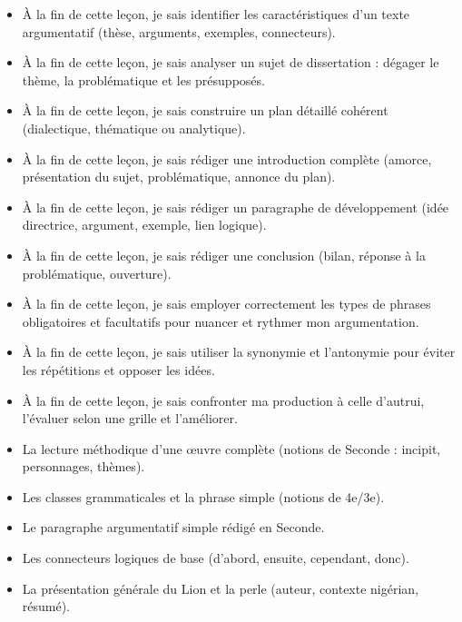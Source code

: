 \documentclass[11pt]{article}
\begin{document}
\begin{objectifs}
\begin{itemize}
\item À la fin de cette leçon, je sais identifier les caractéristiques d'un texte argumentatif (thèse, arguments, exemples, connecteurs).
\item À la fin de cette leçon, je sais analyser un sujet de dissertation : dégager le thème, la problématique et les présupposés.
\item À la fin de cette leçon, je sais construire un plan détaillé cohérent (dialectique, thématique ou analytique).
\item À la fin de cette leçon, je sais rédiger une introduction complète (amorce, présentation du sujet, problématique, annonce du plan).
\item À la fin de cette leçon, je sais rédiger un paragraphe de développement (idée directrice, argument, exemple, lien logique).
\item À la fin de cette leçon, je sais rédiger une conclusion (bilan, réponse à la problématique, ouverture).
\item À la fin de cette leçon, je sais employer correctement les types de phrases obligatoires et facultatifs pour nuancer et rythmer mon argumentation.
\item À la fin de cette leçon, je sais utiliser la synonymie et l'antonymie pour éviter les répétitions et opposer les idées.
\item À la fin de cette leçon, je sais confronter ma production à celle d'autrui, l'évaluer selon une grille et l'améliorer.
\end{itemize}
\end{objectifs}

\begin{prerequis}
\begin{itemize}
\item La lecture méthodique d'une œuvre complète (notions de Seconde : incipit, personnages, thèmes).
\item Les classes grammaticales et la phrase simple (notions de 4e/3e).
\item Le paragraphe argumentatif simple rédigé en Seconde.
\item Les connecteurs logiques de base (d'abord, ensuite, cependant, donc).
\item La présentation générale du Lion et la perle (auteur, contexte nigérian, résumé).
\end{itemize}
\end{prerequis}
\end{document}
